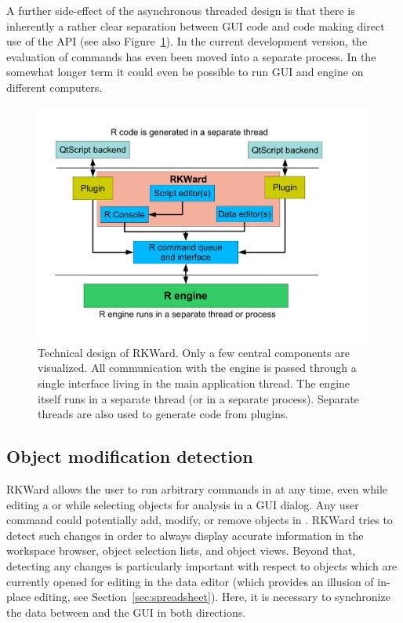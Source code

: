 A further side-effect of the asynchronous threaded design is that there is
inherently a rather clear separation between GUI code and code making direct use
of the  API (see also Figure~\ref{fig:design_sketch}). In the current development version, the evaluation
of  commands has even been moved into a separate process. In the somewhat longer term it could even
be possible to run GUI and  engine on different computers.

\begin{figure}[htp]
 \centering
 \includegraphics{../figures/design_sketch.pdf}
 \caption{Technical design of RKWard. Only a few central components are visualized.
 All communication with the  engine is passed through a single interface living in the main application thread. The  engine itself
 runs in a separate thread (or in a separate process). 
 Separate threads are also used to generate  code from plugins.
}
 \label{fig:design_sketch}
\end{figure}

\subsection{Object modification detection}
\label{sec:technical_omd}
RKWard allows the user to run arbitrary commands in  at any time, even while
editing a  or while selecting objects for analysis in a GUI dialog. Any user
command could potentially add, modify, or remove objects in . RKWard tries to
detect such changes in order to always display accurate information in the
workspace browser, object selection lists, and object views. Beyond that,
detecting any changes is particularly important with respect to objects which
are currently opened for editing in the data editor (which provides an illusion
of in-place editing, see Section~\ref{sec:spreadsheet}). Here, it is necessary to synchronize
the data between  and the GUI in both directions.

